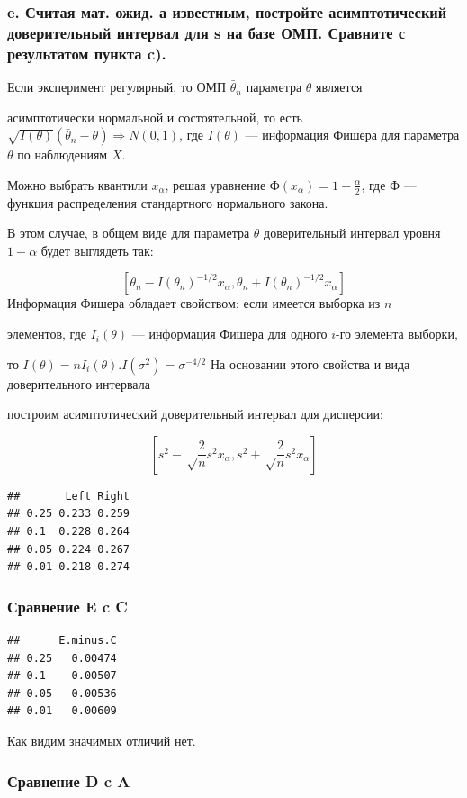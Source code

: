 \documentclass[]{article}
\begin{document}
\subsubsection{e. Считая мат. ожид. а известным, постройте
асимптотический доверительный интервал для s на базе ОМП. Сравните с
результатом пункта c).}\label{e.--.-.--------s---.-----c.}

Если эксперимент регулярный, то ОМП \(\bar θ_n\) параметра \(θ\)
является

асимптотически нормальной и состоятельной, то есть
\(\sqrt{I(θ)}(\bar θ_n − θ)⇒ N(0,1)\), где \(I(θ)\) --- информация
Фишера для параметра \(θ\) по наблюдениям \(X\).

Можно выбрать квантили \(x_α\), решая уравнение
\(Ф(x_α) = 1- \frac {α}{2}\), где \(Ф\) --- функция распределения
стандартного нормального закона.

В этом случае, в общем виде для параметра \(θ\) доверительный интервал
уровня \(1-α\) будет выглядеть так:

\[[ θ_n − I( θ_n)^{−1 /2} x_{\alpha} , θ_n + I( θ_n)^{−1 /2} x_{\alpha}]\]
Информация Фишера обладает свойством: если имеется выборка из \(n\)

элементов, где \(I_i(θ)\) --- информация Фишера для одного \(i\)-го
элемента выборки,

то \(I(θ)=nI_i(θ)\).\(I(σ^2) = σ^{−4/2}\) На основании этого свойства и
вида доверительного интервала

построим асимптотический доверительный интервал для дисперсии:

\[[s^2−\sqrt \frac {2}{n} s^2 x_\alpha, s^2+\sqrt \frac {2}{n} s^2 x_\alpha]\]

\begin{verbatim}
##       Left Right
## 0.25 0.233 0.259
## 0.1  0.228 0.264
## 0.05 0.224 0.267
## 0.01 0.218 0.274
\end{verbatim}

\subsubsection{Сравнение E c C}\label{-e-c-c}

\begin{verbatim}
##      E.minus.C
## 0.25   0.00474
## 0.1    0.00507
## 0.05   0.00536
## 0.01   0.00609
\end{verbatim}

Как видим значимых отличий нет.

\subsubsection{Сравнение D c A}\label{-d-c-a}
\end{document}
